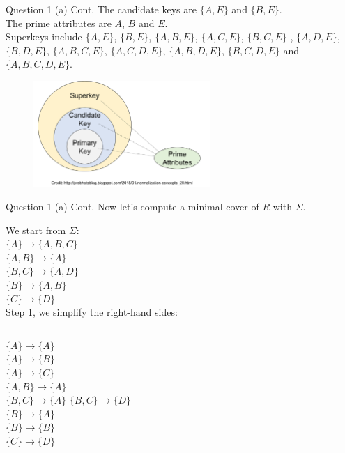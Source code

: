 \begin{frame}[fragile]{Question 1 (a) Cont.}
	The candidate keys are $\{A, E\}$ and $\{B, E\}$. \\\vspace{10pt}
	The prime attributes are $A$, $B$ and $E$.\\ \vspace{10pt}
	Superkeys include  $\{A, E\}$, $\{B, E\}$, $\{A, B, E\}$, $\{A, C, E\}$, $\{B, C, E\}$ , $\{A, D, E\}$, $\{B, D, E\}$, $\{A, B, C, E\}$, $\{A, C, D, E\}$, $\{A, B, D, E\}$, $\{B, C, D, E\}$ and $\{A, B, C, D, E\}$.\\ \vspace{15pt}
	\begin{figure}
		\includegraphics[width=0.6\textwidth, trim=0 0 0 0, clip]{t5/images/keys.png}
	\end{figure}
\end{frame}

\begin{frame}[fragile]{Question 1 (a) Cont.}
	Now let's compute a minimal cover of $R$ with $\Sigma$.\vspace{10pt}
	
	We start from $\Sigma$: \\\vspace{5pt}
	$\{A\} \rightarrow \{A, B, C\}$\\
	$\{A, B\} \rightarrow \{A\}$\\
	$\{B, C\} \rightarrow \{A, D\}$\\
	$\{B\} \rightarrow \{A, B\}$\\
	$\{C\} \rightarrow \{D\}$\\\vspace{5pt}
	Step 1, we simplify the right-hand sides:\\\vspace{3pt}
	\begin{columns}[t]
	$\{A\} \rightarrow \{A\}$\\
	$\{A\} \rightarrow \{B\}$\\
	$\{A\} \rightarrow \{C\}$\\
	$\{A, B\} \rightarrow \{A\}$\\
	$\{B, C\} \rightarrow \{A\}$
	$\{B, C\} \rightarrow \{D\}$\\
	$\{B\} \rightarrow \{A\}$\\
	$\{B\} \rightarrow \{B\}$\\
	$\{C\} \rightarrow \{D\}$
	\end{columns}
\end{frame}

